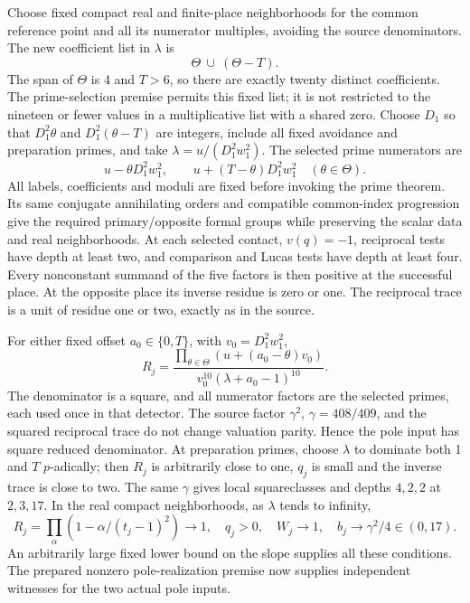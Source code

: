 \documentclass[11pt,a4paper]{article}
\begin{document}
Choose fixed compact real and finite-place neighborhoods for the
common reference point and all its numerator multiples, avoiding the
source denominators. The new coefficient list in $\lambda$ is
\[
                       \Theta\ \cup\ (\Theta-T).
\]
The span of $\Theta$ is 4 and $T>6$, so there are exactly twenty
distinct coefficients. The prime-selection premise permits this
fixed list; it is not restricted to the nineteen or fewer values in
a multiplicative list with a shared zero. Choose $D_1$ so that
$D_1^2\theta$ and $D_1^2(\theta-T)$ are integers, include all fixed
avoidance and preparation primes, and take
$\lambda=u/(D_1^2w_1^2)$. The selected prime numerators are
\[
             u-\theta D_1^2w_1^2,\qquad
             u+(T-\theta)D_1^2w_1^2\quad(\theta\in\Theta).
\]
All labels, coefficients and moduli are fixed before invoking the
prime theorem. Its same conjugate annihilating orders and compatible
common-index progression give the required primary/opposite formal
groups while preserving the scalar data and real neighborhoods.
At each selected contact, $v(q)=-1$, reciprocal tests have depth at
least two, and comparison and Lucas tests have depth at least four.
Every nonconstant summand of the five factors is then positive at
the successful place. At the opposite place its inverse residue is
zero or one. The reciprocal trace is a unit of residue one or two,
exactly as in the source.

For either fixed offset $a_0\in\{0,T\}$, with $v_0=D_1^2w_1^2$,
\[
 R_j=\frac{\prod_{\theta\in\Theta}(u+(a_0-\theta)v_0)}
                {v_0^{10}(\lambda+a_0-1)^{10}}.
\]
The denominator is a square, and all numerator factors are the
selected primes, each used once in that detector. The source factor
$\gamma^2$, $\gamma=408/409$, and the squared reciprocal trace do
not change valuation parity. Hence the pole input has square reduced
denominator. At preparation primes, choose $\lambda$ to dominate
both 1 and $T$ $p$-adically; then $R_j$ is arbitrarily close to one,
$q_j$ is small and the inverse trace is close to two. The same
$\gamma$ gives local squareclasses and depths $4,2,2$ at $2,3,17$.
In the real compact neighborhoods, as $\lambda$ tends to infinity,
\[
 R_j=\prod_{\alpha}(1-\alpha/(t_j-1)^2)\longrightarrow1,
 \quad q_j>0,\quad W_j\longrightarrow1,
 \quad b_j\longrightarrow\gamma^2/4\in(0,17).
\]
An arbitrarily large fixed lower bound on the slope supplies all
these conditions. The prepared nonzero pole-realization premise now
supplies independent witnesses for the two actual pole inputs.
\end{document}

